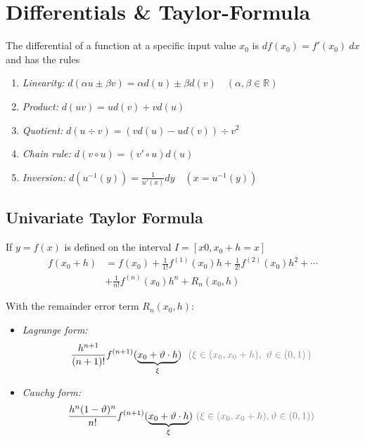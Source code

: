 \section{Differentials \& Taylor-Formula}

The differential of a function at a specific input value $x_0$ is
$df(x_0) = f'(x_0)\ dx$ and has the rules
\begin{enumerate}
    \item \emph{Linearity:} $d(\alpha u \pm \beta v) = \alpha d(u)\pm \beta d(v)\quad(\alpha, \beta \in \mathbb{R})$
    \item \emph{Product:} $d(uv) = ud(v)+vd(u)$
    \item \emph{Quotient:} $d(u\div v) = (vd(u) - ud(v))\div v^2$
    \item \emph{Chain rule:} $d(v \circ u) = (v'\circ u)d(u)$
    \item \emph{Inversion:} $d(u^{-1}(y))=\frac{1}{u'(x)}dy\quad(x=u^{-1}(y))$
\end{enumerate}

\subsection{Univariate Taylor Formula}

If $y=f(x)$ is defined on the interval $I=[x0,x_0+h=x]$
\begin{align*}
    f(x_{0}+h) & =
    f(x_{0})+\frac{1}{1!} f^{(1)}(x_{0})h + \frac{1}{2!}f^{(2)}(x_{0})h^{2} + \cdots \\
    & + \frac{1}{n!}f^{(n)}(x_{0})h^{n}+R_{n}(x_{0},h)
\end{align*}

With the remainder error term $R_n(x_0, h)$:
\begin{itemize}
    \item{
        \emph{Lagrange form:}
        \begin{align*}
            \frac{h^{n+1}}{(n+1)!} f^{(n+1)}({\underbrace{x_{0}+\vartheta\cdot h}_{\xi}})
            \ \ {\color{gray} (\xi\in(x_{0},x_{0}+h),\ \vartheta\in(0,1)\,)}
        \end{align*}
    }
    \item{
        \emph{Cauchy form:}
        \begin{align*}
            \frac{h^{n}(1-\vartheta)^{n}}{n!}f^{(n+1)}(\underbrace{x_0+\vartheta\cdot h}_\xi)
            \ {\color{gray} (\xi\in(x_0,x_0+h), \vartheta\in(0,1))}
        \end{align*}
    }
\end{itemize}

